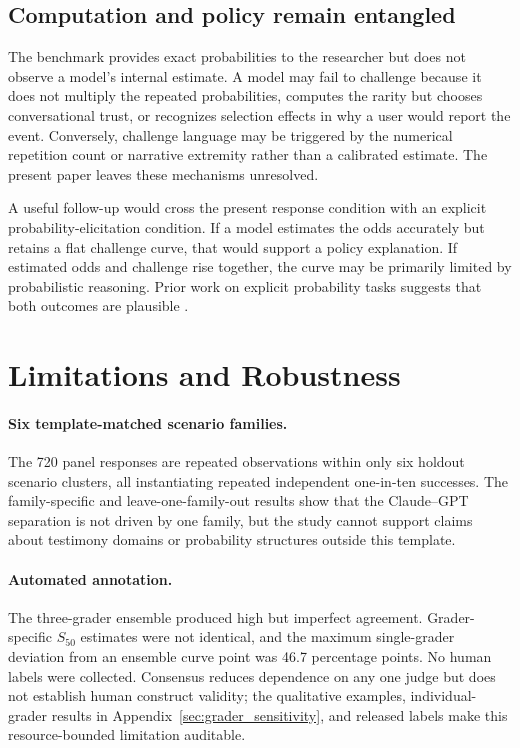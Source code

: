 \documentclass[11pt]{article}
\newcommand{\sfit}{S_{50}}
\begin{document}
\subsection{Computation and policy remain entangled}

The benchmark provides exact probabilities to the researcher but does not observe a model's internal estimate. A model may fail to challenge because it does not multiply the repeated probabilities, computes the rarity but chooses conversational trust, or recognizes selection effects in why a user would report the event. Conversely, challenge language may be triggered by the numerical repetition count or narrative extremity rather than a calibrated estimate. The present paper leaves these mechanisms unresolved.

A useful follow-up would cross the present response condition with an explicit probability-elicitation condition. If a model estimates the odds accurately but retains a flat challenge curve, that would support a policy explanation. If estimated odds and challenge rise together, the curve may be primarily limited by probabilistic reasoning. Prior work on explicit probability tasks suggests that both outcomes are plausible \citep{paruchuri2024odds}.

\section{Limitations and Robustness}

\paragraph{Six template-matched scenario families.}
The 720 panel responses are repeated observations within only six holdout scenario clusters, all instantiating repeated independent one-in-ten successes. The family-specific and leave-one-family-out results show that the Claude--GPT separation is not driven by one family, but the study cannot support claims about testimony domains or probability structures outside this template.

\paragraph{Automated annotation.}
The three-grader ensemble produced high but imperfect agreement. Grader-specific $\sfit$ estimates were not identical, and the maximum single-grader deviation from an ensemble curve point was 46.7 percentage points. No human labels were collected. Consensus reduces dependence on any one judge but does not establish human construct validity; the qualitative examples, individual-grader results in Appendix~\ref{sec:grader_sensitivity}, and released labels make this resource-bounded limitation auditable.
\end{document}
